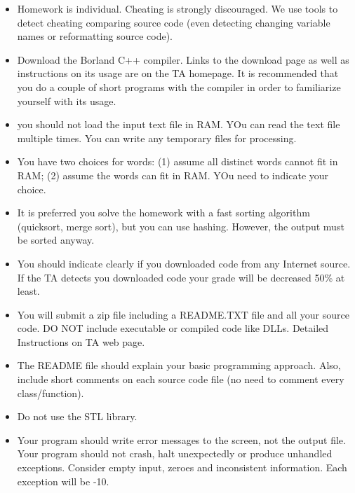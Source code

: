 \begin{itemize}
\item Homework is individual. Cheating is strongly discouraged. We use tools to detect
cheating comparing source code 
(even detecting changing variable names or reformatting source code).

\item Download the Borland C++ compiler. Links to the download page as well as instructions on its usage are on the TA homepage. It is recommended that you do a couple of short programs with the compiler in order to familiarize yourself with its usage.

\item you should not load the input text file in RAM. YOu can read the text file multiple times.
       You can write any temporary files for processing.

\item You have two choices for words: 
(1) assume all distinct words cannot fit in RAM; (2) assume the words
can fit in RAM. YOu need to indicate your choice.

\item It is preferred you solve the homework with a fast 
sorting algorithm (quicksort, merge sort), but you can use hashing.
However, the output must be sorted anyway.

\item You should indicate clearly if you downloaded code from any Internet source.
If the TA detects you downloaded code your grade will be decreased 50\% at least.

\item You will submit a zip file including a README.TXT file and all your source code.
DO NOT include executable or compiled code like DLLs. Detailed Instructions on TA web page.

\item The README file should explain your basic programming approach. 
Also, include short comments on each source code file (no need to comment
every class/function).

\item Do not use the STL library. 

\item Your program should write error messages to the screen, not the output file.
Your program should not crash, halt unexpectedly or produce 
unhandled exceptions. 
Consider empty input, zeroes and inconsistent information.
Each exception will be -10. 



\end{itemize}
